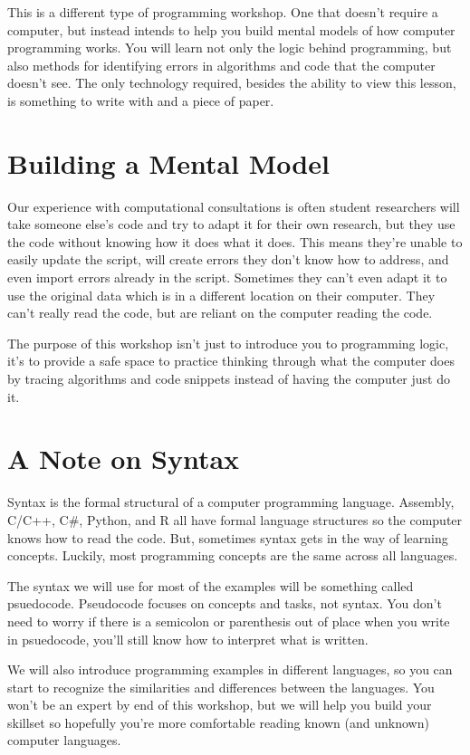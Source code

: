 \documentclass[
]{book}
\begin{document}
This is a different type of programming workshop. One that doesn't require a computer, but instead intends to help you build mental models of how computer programming works. You will learn not only the logic behind programming, but also methods for identifying errors in algorithms and code that the computer doesn't see. The only technology required, besides the ability to view this lesson, is something to write with and a piece of paper.

\section{Building a Mental Model}\label{building-a-mental-model}

Our experience with computational consultations is often student researchers will take someone else's code and try to adapt it for their own research, but they use the code without knowing how it does what it does. This means they're unable to easily update the script, will create errors they don't know how to address, and even import errors already in the script. Sometimes they can't even adapt it to use the original data which is in a different location on their computer. They can't really read the code, but are reliant on the computer reading the code.

The purpose of this workshop isn't just to introduce you to programming logic, it's to provide a safe space to practice thinking through what the computer does by tracing algorithms and code snippets instead of having the computer just do it.

\section{A Note on Syntax}\label{a-note-on-syntax}

Syntax is the formal structural of a computer programming language. Assembly, C/C++, C\#, Python, and R all have formal language structures so the computer knows how to read the code. But, sometimes syntax gets in the way of learning concepts. Luckily, most programming concepts are the same across all languages.

The syntax we will use for most of the examples will be something called psuedocode. Pseudocode focuses on concepts and tasks, not syntax. You don't need to worry if there is a semicolon or parenthesis out of place when you write in psuedocode, you'll still know how to interpret what is written.

We will also introduce programming examples in different languages, so you can start to recognize the similarities and differences between the languages. You won't be an expert by end of this workshop, but we will help you build your skillset so hopefully you're more comfortable reading known (and unknown) computer languages.
\end{document}
